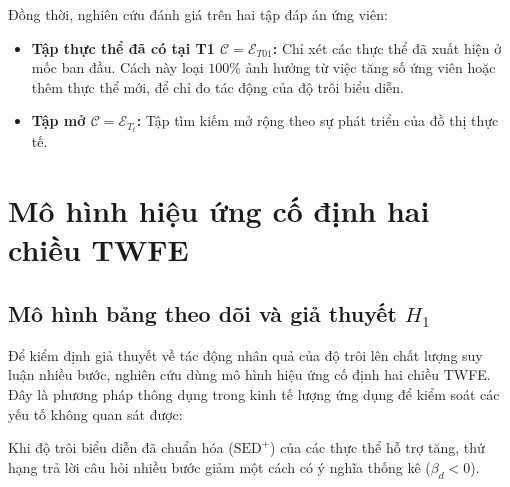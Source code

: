 Đồng thời, nghiên cứu đánh giá trên hai tập đáp án ứng viên:
\begin{itemize}
    \item \textbf{Tập thực thể đã có tại T1 $\mathcal{C} = \mathcal{E}_{T01}$:} Chỉ xét các thực thể đã xuất hiện ở mốc ban đầu. Cách này loại $100\%$ ảnh hưởng từ việc tăng số ứng viên hoặc thêm thực thể mới, để chỉ đo tác động của độ trôi biểu diễn.
    \item \textbf{Tập mở $\mathcal{C} = \mathcal{E}_{T_t}$:} Tập tìm kiếm mở rộng theo sự phát triển của đồ thị thực tế.
\end{itemize}


\section{Mô hình hiệu ứng cố định hai chiều TWFE}
\label{sec:twfe_econometrics}

\subsection{Mô hình bảng theo dõi và giả thuyết \texorpdfstring{$H_1$}{H1}}
Để kiểm định giả thuyết về tác động nhân quả của độ trôi lên chất lượng suy luận nhiều bước, nghiên cứu dùng mô hình hiệu ứng cố định hai chiều TWFE. Đây là phương pháp thông dụng trong kinh tế lượng ứng dụng để kiểm soát các yếu tố không quan sát được:

\begin{hypothesis}
Khi độ trôi biểu diễn đã chuẩn hóa ($\text{SED}^+$) của các thực thể hỗ trợ tăng, thứ hạng trả lời câu hỏi nhiều bước giảm một cách có ý nghĩa thống kê ($\beta_d < 0$).
\end{hypothesis}

